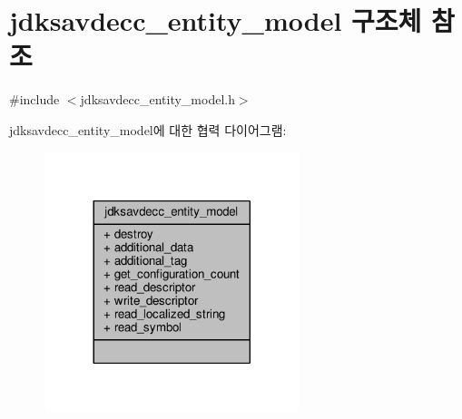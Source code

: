 \hypertarget{structjdksavdecc__entity__model}{}\section{jdksavdecc\+\_\+entity\+\_\+model 구조체 참조}
\label{structjdksavdecc__entity__model}


{\ttfamily \#include $<$jdksavdecc\+\_\+entity\+\_\+model.\+h$>$}



jdksavdecc\+\_\+entity\+\_\+model에 대한 협력 다이어그램\+:
\nopagebreak
\begin{figure}[H]
\begin{center}
\leavevmode
\includegraphics[width=209pt]{structjdksavdecc__entity__model__coll__graph}
\end{center}
\end{figure}
